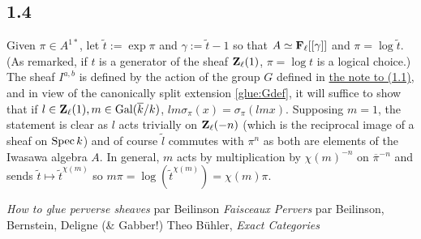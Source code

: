 \documentclass[deligne.tex]{subfiles}
\begin{document}
\subsection*{1.4} Given $\pi\in A^{1*}$, let $\tilde t:=\exp\pi$ and 
$\gamma:=\tilde t-1$ so that $A\simeq\mathbf{F}_\ell[[\gamma]]$ and
$\pi=\log\tilde t$.
(As remarked, if $t$ is a generator of the sheaf $\mathbf{Z}_\ell(1)$,
$\pi=\log t$ is a logical choice.)
The sheaf $I^{a,b}$ is defined by the action of the
group $G$ defined in \hyperref[glue:1.1]{the note to (1.1)},
and in view of the canonically split extension \eqref{glue:Gdef}, it will
suffice to show that if $l\in\mathbf{Z}_\ell(1),m\in\operatorname{Gal}(\overline k/k)$,
$lm\sigma_\pi(x)=\sigma_\pi(lmx)$.
Supposing $m=1$, the statement is clear as $l$ acts trivially on
$\mathbf{Z}_\ell(-n)$ (which is the reciprocal image of a sheaf on $\operatorname{Spec} k$)
and of course $\tilde l$ commutes with $\pi^n$ as both are elements of the
Iwasawa algebra $A$. In general, $m$ acts by multiplication by
$\chi(m)^{-n}$ on $\overline \pi^{-n}$ and sends
$\tilde t\mapsto\tilde t^{\chi(m)}$ so 
$m\pi=\log(\tilde t^{\chi(m)})=\chi(m)\pi$.


\begin{thebibliography}{BBD}
	 \emph{How to glue perverse sheaves} par Beilinson
	 \textit{Faisceaux Pervers}
	par Beilinson, Bernstein, Deligne (\& Gabber!)
	 Theo Bühler, \emph{Exact Categories}
\end{thebibliography}
\end{document}
